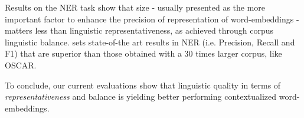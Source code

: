 Results on the NER task show that size - usually presented as the more important factor to enhance the precision of representation of word-embeddings - matters less than linguistic representativeness, as achieved through corpus linguistic balance. \ELMocoscar sets state-of-the art results in NER (i.e. Precision, Recall and F1) that are superior than those obtained with a 30 times larger corpus, like OSCAR.





To conclude, our current evaluations show that linguistic quality in terms of \textit{representativeness} and balance is yielding better performing contextualized word-embeddings.